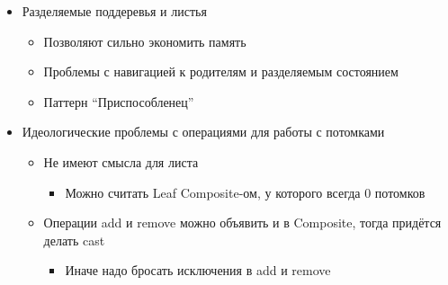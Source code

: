 \documentclass[xetex,mathserif,serif]{beamer}
\begin{document}
\begin{frame}
        \begin{itemize}
            \item Разделяемые поддеревья и листья
            \begin{itemize}
                \item Позволяют сильно экономить память
                \item Проблемы с навигацией к родителям и разделяемым состоянием
                \item Паттерн ``Приспособленец''
            \end{itemize}
            \item Идеологические проблемы с операциями для работы с потомками
            \begin{itemize}
                \item Не имеют смысла для листа
                \begin{itemize}
                    \item Можно считать Leaf Composite-ом, у которого всегда 0 потомков
                \end{itemize}
                \item Операции add и remove можно объявить и в Composite, тогда придётся делать cast
                \begin{itemize}
                    \item Иначе надо бросать исключения в add и remove
                \end{itemize}
            \end{itemize}
        \end{itemize}
    \end{frame}
\end{document}
